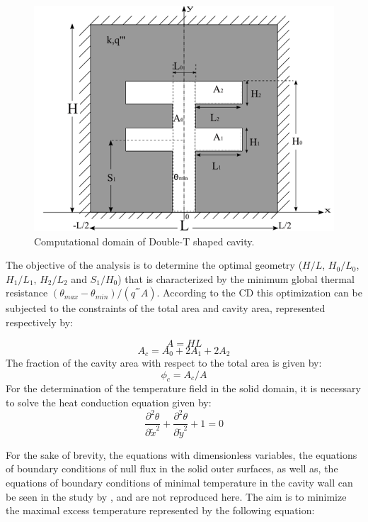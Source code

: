 \documentclass[10pt,fleqn,a4paper,twoside]{article}
\newcommand\tab[1][0.5cm]{\hspace*{#1}}
\begin{document}
\begin{figure}[h!]
\centering
\includegraphics[width=0.6\linewidth]{imgs/duplo_t.png}
\caption{ {\small Computational domain of Double-T shaped cavity.}}
\label{figure01}
\end{figure}

The objective of the analysis is to determine the optimal geometry ($H/L$, $H_{0}/L_{0}$, $H_{1}/L_{1}$, $H_{2}/L_{2}$ and $S_{1}/H_{0}$) that is characterized by the minimum global thermal resistance $(\theta_{max} - \theta_{min})/(q^{'''}A)$. According to the CD this optimization can be subjected to the constraints of the total area and cavity area, represented respectively by:

\begin{equation}
A = HL \label{area_total}
\end{equation}
\begin{equation}
A_{c} = A_{0} + 2A_{1} + 2A_{2} \label{area_cavidade}
\end{equation}
\tab The fraction of the cavity area with respect to the total area is given by:
\begin{equation}
\phi_{c} = A_{c}/A \label{fi}
\end{equation}
\tab For the determination of the temperature field in the solid domain, it is necessary to solve the heat conduction equation given by:
\begin{equation}
\frac{\partial^{2} \theta}{\partial \tilde{x}^{2}}+\frac{\partial^{2} \theta}{\partial \tilde{y}^{2}}+1=0\label{calor}
\end{equation}

For the sake of brevity, the equations with dimensionless variables, the equations of boundary conditions of null flux in the solid outer surfaces, as well as, the equations of boundary conditions of minimal temperature in the cavity wall can be seen in the study by \cite{Gonzales2015b}, and are not reproduced here. The aim is to minimize the maximal excess temperature represented by the following equation:
\end{document}
